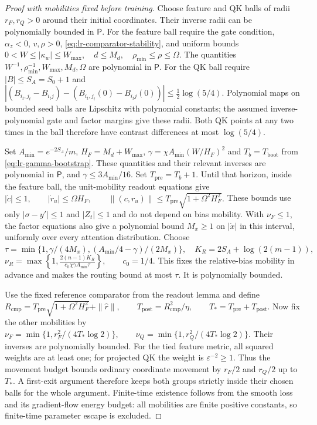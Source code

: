\begin{proof}[Proof with mobilities fixed before training]
Choose feature and QK balls of radii $r_F,r_Q>0$ around their initial
coordinates. Their inverse radii can be polynomially bounded in $\mathsf P$.
For the feature ball require the gate condition, $\alpha_z<0$, $v,\rho>0$,
\eqref{eq:lr-comparator-stability}, and uniform bounds
 $0<W\le|\kappa_w|\le W_{\max},\quad d\le M_d,\quad \rho_{\min}\le\rho\le\Omega.$ 
The quantities $W^{-1},\rho_{\min}^{-1},W_{\max},M_d,\Omega$ are
polynomial in $\mathsf P$. For the QK ball require $|B|\le S_A=S_0+1$ and
 $|(B_{i_t,j_t}-B_{i_tj})-(B_{i_t,j_t}(0)-B_{i_tj}(0))| \le\tfrac12\log(5/4).$ 
Polynomial maps on bounded seed balls are Lipschitz with polynomial
constants; the assumed inverse-polynomial gate and factor margins give
these radii. Both QK points at any two times in the ball therefore have
contrast differences at most $\log(5/4)$.

Set $A_{\min}=e^{-2S_A}/m$, $H_F=M_d+W_{\max}$,
$\gamma=\chi A_{\min}(W/H_F)^2$ and $T_b=T_{\mathrm{boot}}$ from
\eqref{eq:lr-gamma-bootstrap}. These quantities and their relevant
inverses are polynomial in $\mathsf P$, and $\gamma\le3A_{\min}/16$.
Set $T_{\mathrm{pre}}=T_b+1$. Until that horizon, inside the feature
ball, the unit-mobility readout equations give
 $|\dot c|\le1,\qquad |\dot r_u|\le\Omega H_F, \qquad \|(c,r_u)\|\le T_{\mathrm{pre}}\sqrt{1+\Omega^2H_F^2}.$ 
These bounds use only $|\sigma-y'|\le1$ and $|Z_t|\le1$ and do not
depend on bias mobility. With $\nu_F\le1$, the factor equations also
give a polynomial bound $M_x\ge1$ on $|\dot x|$ in this interval,
uniformly over every attention distribution. Choose
 $\tau=\min\{1,\gamma/(4M_x),(A_{\min}/4-\gamma)/(2M_x)\}, \quad K_R=2S_A+\log(2(m-1)),$ 
 $\nu_R=\max\left\{1, \frac{2(n-1)K_R}{c_0\chi\gamma A_{\min}\tau}\right\}, \qquad c_0=1/4.$ 
This fixes the relative-bias mobility in advance and makes the routing
bound at most $\tau$. It is polynomially bounded.

Use the fixed reference comparator from the readout lemma and define
 $R_{\mathrm{cmp}}=T_{\mathrm{pre}}\sqrt{1+\Omega^2H_F^2}+\|\widehat r\|, \qquad T_{\mathrm{post}}=R_{\mathrm{cmp}}^2/\eta,\qquad T_*=T_{\mathrm{pre}}+T_{\mathrm{post}}.$ 
Now fix the other mobilities by
 $\nu_F=\min\{1,r_F^2/(4T_*\log2)\},\qquad \nu_Q=\min\{1,r_Q^2/(4T_*\log2)\}.$ 
Their inverses are polynomially bounded. For the tied feature metric,
all squared weights are at least one; for projected QK the weight is
$\varepsilon^{-2}\ge1$. Thus the movement budget bounds ordinary
coordinate movement by $r_F/2$ and $r_Q/2$ up to $T_*$.
A first-exit argument therefore keeps both groups strictly inside their
chosen balls for the whole argument. Finite-time existence follows from
the smooth loss and its gradient-flow energy budget: all mobilities are
finite positive constants, so finite-time parameter escape is excluded.


\end{proof}
